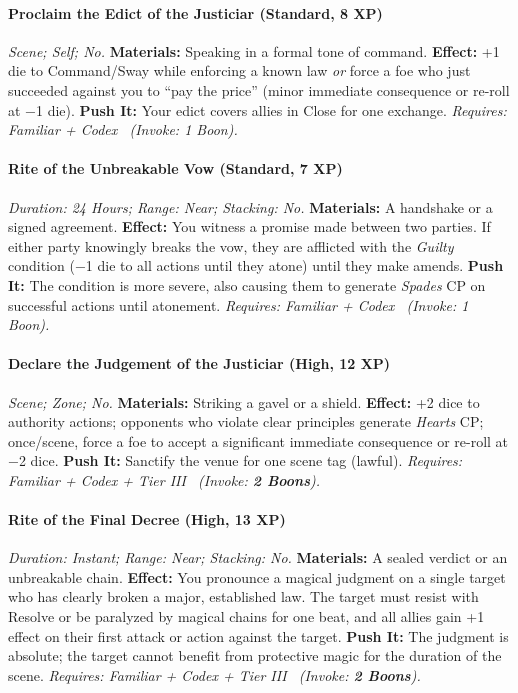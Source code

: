 \documentclass[12pt,twoside]{book}
\begin{document}
\paragraph{Proclaim the Edict of the Justiciar (Standard, 8 XP)} \emph{Scene; Self; No.}
\textbf{Materials:} Speaking in a formal tone of command.
\textbf{Effect:} +1 die to Command/Sway while enforcing a known law \emph{or} force a foe who just succeeded against you to ``pay the price'' (minor immediate consequence or re-roll at −1 die).
\textbf{Push It:} Your edict covers allies in Close for one exchange.
\emph{Requires: Familiar + Codex \ (\textit{Invoke:} 1 Boon).}
\paragraph{Rite of the Unbreakable Vow (Standard, 7 XP)} \emph{Duration: 24 Hours; Range: Near; Stacking: No.}
\textbf{Materials:} A handshake or a signed agreement.
\textbf{Effect:} You witness a promise made between two parties. If either party knowingly breaks the vow, they are afflicted with the \emph{Guilty} condition (−1 die to all actions until they atone) until they make amends.
\textbf{Push It:} The condition is more severe, also causing them to generate \emph{Spades} CP on successful actions until atonement.
\emph{Requires: Familiar + Codex \ (\textit{Invoke:} 1 Boon).}
\paragraph{Declare the Judgement of the Justiciar (High, 12 XP)} \emph{Scene; Zone; No.}
\textbf{Materials:} Striking a gavel or a shield.
\textbf{Effect:} +2 dice to authority actions; opponents who violate clear principles generate \emph{Hearts} CP; once/scene, force a foe to accept a significant immediate consequence or re-roll at −2 dice.
\textbf{Push It:} Sanctify the venue for one scene tag (lawful).
\emph{Requires: Familiar + Codex + Tier III \ (\textit{Invoke:} \textbf{2 Boons}).}
\paragraph{Rite of the Final Decree (High, 13 XP)} \emph{Duration: Instant; Range: Near; Stacking: No.}
\textbf{Materials:} A sealed verdict or an unbreakable chain.
\textbf{Effect:} You pronounce a magical judgment on a single target who has clearly broken a major, established law. The target must resist with Resolve or be paralyzed by magical chains for one beat, and all allies gain +1 effect on their first attack or action against the target.
\textbf{Push It:} The judgment is absolute; the target cannot benefit from protective magic for the duration of the scene.
\emph{Requires: Familiar + Codex + Tier III \ (\textit{Invoke:} \textbf{2 Boons}).}
\end{document}

